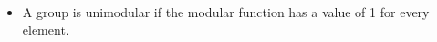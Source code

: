 \documentclass[preview]{standalone}
\begin{document}
\begin{center}
\begin{itemize} \item A group is unimodular if the modular function has a value of 1 for every element.\vspace{-10pt}\end{itemize}
\end{center}
\end{document}
